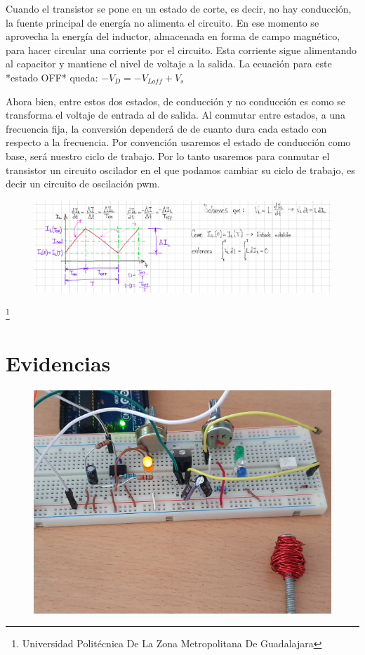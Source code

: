 \documentclass[11pt,a4paper]{article}
\begin{document}
Cuando el transistor se pone en un estado de corte, es decir, no hay conducción, la fuente principal de energía no alimenta el circuito. En ese momento se aprovecha la energía del inductor, almacenada en forma de campo magnético, para hacer circular una corriente por el circuito. Esta corriente sigue alimentando al capacitor y mantiene el nivel de voltaje a la salida. La ecuación para este *estado OFF* queda: $ - V_D = - V_{Loff} + V_s $

Ahora bien, entre estos dos estados, de conducción y no conducción es como se transforma el voltaje de entrada al de salida. Al conmutar entre estados, a una frecuencia fija, la conversión dependerá de de cuanto dura cada estado con respecto a la frecuencia. Por convención usaremos el estado de conducción como base, será nuestro ciclo de trabajo. Por lo tanto usaremos para conmutar el transistor un circuito oscilador en el que podamos cambiar su ciclo de trabajo, es decir un circuito de oscilación pwm.

\begin{figure}[hbtp]
\centering
\includegraphics[scale=0.35]{4.png}
\end{figure}

\footnote{Universidad Politécnica De La Zona Metropolitana De Guadalajara} 

\newpage

\section{Evidencias}

\begin{figure}[hbtp]
\centering
\includegraphics[scale=0.80]{5.png}
\end{figure}
\end{document}
